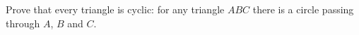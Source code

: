 Prove that every triangle is cyclic: for any triangle $ABC$ there is a circle passing through $A$, $B$ and $C$.
